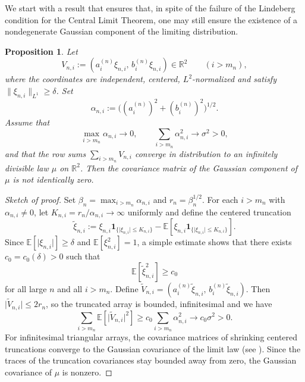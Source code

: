 \documentclass[11pt]{amsart}
\numberwithin{equation}{section}
\newtheorem{proposition}[theorem]{Proposition}
\theoremstyle{definition}
\theoremstyle{remark}
\newcommand{\E}{\mathbb E}
\newcommand{\R}{\mathbb R}
\newcommand{\abs}[1]{\lvert #1 \rvert}
\newcommand{\norm}[1]{\lVert #1 \rVert}
\begin{document}
We start with a result that ensures that, in spite of the failure of the Lindeberg condition for the Central Limit Theorem, one may still ensure the existence of a nondegenerate Gaussian component of the limiting distribution. 
\begin{proposition}
\label{prop:gaussian-part}
Let
\[
V_{n,i}:=(a_i^{(n)}\xi_{n,i},\,b_i^{(n)}\xi_{n,i})\in\R^2
\qquad(i>m_n),
\]
where the coordinates are independent, centered, $L^2$-normalized and satisfy
$\norm{\xi_{n,i}}_{L^1}\ge \delta$.  Set
\[
\alpha_{n,i}:=\bigl((a_i^{(n)})^2+(b_i^{(n)})^2\bigr)^{1/2}.
\]
Assume that
\[
\max_{i>m_n}\alpha_{n,i}\to0,
\qquad
\sum_{i>m_n}\alpha_{n,i}^2\to \sigma^2>0,
\]
and that the row sums $\sum_{i>m_n}V_{n,i}$ converge in distribution to an
infinitely divisible law $\mu$ on $\R^2$.  Then the covariance matrix of the Gaussian component of $\mu$ is not identically zero.
\end{proposition}

\begin{proof}[Sketch of proof]
Set $\beta_n=\max_{i>m_n}\alpha_{n,i}$ and $r_n=\beta_n^{1/2}$.  For each
$i>m_n$ with $\alpha_{n,i}\ne0$, let $K_{n,i}=r_n/\alpha_{n,i}\to\infty$
uniformly and define the centered truncation
\[
\widetilde\xi_{n,i}
:=
\xi_{n,i}\mathbf 1_{\{\abs{\xi_{n,i}}\le K_{n,i}\}}
-\E[\xi_{n,i}\mathbf 1_{\{\abs{\xi_{n,i}}\le K_{n,i}\}}].
\]
Since $\E[\abs{\xi_{n,i}}]\ge\delta$ and $\E[\xi_{n,i}^2]=1$, a simple estimate shows that there exists $c_0=c_0(\delta)>0$ such that
\[
\E[\widetilde\xi_{n,i}^2]\ge c_0
\]
for all large $n$ and all $i>m_n$.  Define
$\widetilde V_{n,i}=(a_i^{(n)}\widetilde\xi_{n,i},\,b_i^{(n)}\widetilde\xi_{n,i})$.
Then $\abs{\widetilde V_{n,i}}\le 2r_n$, so the truncated array is bounded,
infinitesimal and we have
\[
\sum_{i>m_n}\E[\abs{\widetilde V_{n,i}}^2]
\ge c_0\sum_{i>m_n}\alpha_{n,i}^2
\longrightarrow c_0\sigma^2>0.
\]
For infinitesimal triangular arrays, the covariance matrices of shrinking
centered truncations converge to the Gaussian covariance of the limit law (see
\cite[Chapter~IV]{gnedenko-kolmogorov}).  Since the traces of the truncation
covariances stay bounded away from zero, the Gaussian covariance of $\mu$ is
nonzero.
\end{proof}
\end{document}
